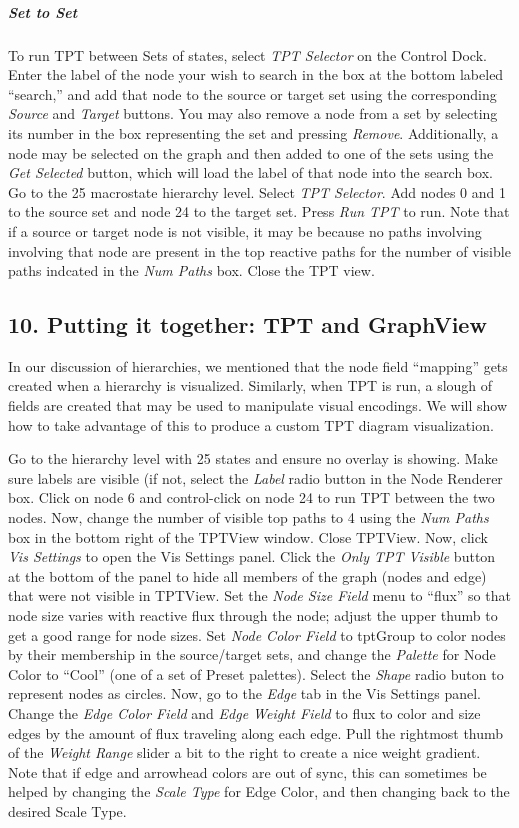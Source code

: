 \documentclass[10pt,a4paper]{report}
\begin{document}
\subparagraph*{Set to Set} 
To run TPT between Sets of states, select \emph{TPT Selector} on the Control Dock. Enter the label of the node your wish to search in the box at the bottom labeled ``search,'' and add that node to the source or target set using the corresponding \emph{Source} and \emph{Target} buttons. You may also remove a node from a set by selecting its number in the box representing the set and pressing \emph{Remove}. Additionally, a node may be selected on the graph and then added to one of the sets using the \emph{Get Selected} button, which will load the label of that node into the search box. Go to the 25 macrostate hierarchy level. Select \emph{TPT Selector}. Add nodes 0 and 1 to the source set and node 24 to the target set. Press \emph{Run TPT} to run. Note that if a source or target node is not visible, it may be because no paths involving involving that node are present in the top reactive paths for the number of visible paths indcated in the \emph{Num Paths} box. Close the TPT view.

\subsection*{10. Putting it together: TPT and GraphView}
In our discussion of hierarchies, we mentioned that the node field ``mapping'' gets created when a hierarchy is visualized. Similarly, when TPT is run, a slough of fields are created that may be used to manipulate visual encodings. We will show how to take advantage of this to produce a custom TPT diagram visualization.

Go to the hierarchy level with 25 states and ensure no overlay is showing. Make sure labels are visible (if not, select the \emph{Label} radio button in the Node Renderer box. Click on node 6 and control-click on node 24 to run TPT between the two nodes. Now, change the number of visible top paths to 4 using the \emph{Num Paths} box in the bottom right of the TPTView window. Close TPTView. Now, click \emph{Vis Settings} to open the Vis Settings panel. Click the \emph{Only TPT Visible} button at the bottom of the panel to hide all members of the graph (nodes and edge) that were not visible in TPTView. Set the \emph{Node Size Field} menu to ``flux'' so that node size varies with reactive flux through the node; adjust the upper thumb to get a good range for node sizes. Set \emph{Node Color Field} to tptGroup to color nodes by their membership in the source/target sets, and change the \emph{Palette} for Node Color to ``Cool'' (one of a set of Preset palettes). Select the \emph{Shape} radio buton to represent nodes as circles. Now, go to the \emph{Edge} tab in the Vis Settings panel. Change the \emph{Edge Color Field} and \emph{Edge Weight Field} to flux to color and size edges by the amount of flux traveling along each edge. Pull the rightmost thumb of the \emph{Weight Range} slider a bit to the right to create a nice weight gradient. Note that if edge and arrowhead colors are out of sync, this can sometimes be helped by changing the \emph{Scale Type} for Edge Color, and then changing back to the desired Scale Type. 
\end{document}
